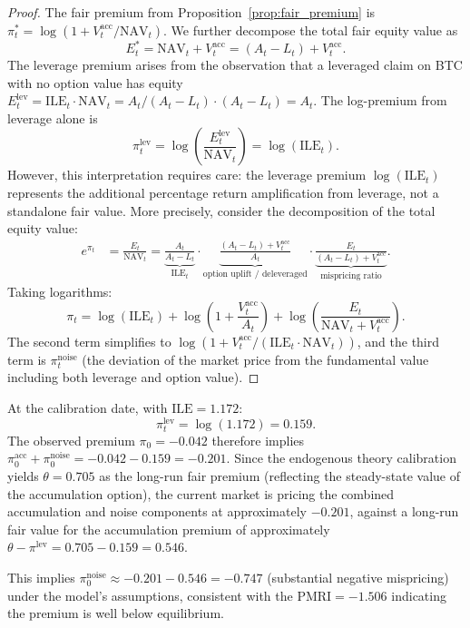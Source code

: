\begin{proof}
The fair premium from Proposition~\ref{prop:fair_premium} is $\pi_t^* = \log(1 + V_t^{\mathrm{acc}} / \mathrm{NAV}_t)$. We further decompose the total fair equity value as
\[
  E_t^* = \mathrm{NAV}_t + V_t^{\mathrm{acc}} = (A_t - L_t) + V_t^{\mathrm{acc}}.
\]
The leverage premium arises from the observation that a leveraged claim on BTC with no option value has equity $E_t^{\mathrm{lev}} = \mathrm{ILE}_t \cdot \mathrm{NAV}_t = A_t / (A_t - L_t) \cdot (A_t - L_t) = A_t$. The log-premium from leverage alone is
\[
  \pi_t^{\mathrm{lev}} = \log\!\left(\frac{E_t^{\mathrm{lev}}}{\mathrm{NAV}_t}\right) = \log(\mathrm{ILE}_t).
\]
However, this interpretation requires care: the leverage premium $\log(\mathrm{ILE}_t)$ represents the additional percentage return amplification from leverage, not a standalone fair value. More precisely, consider the decomposition of the total equity value:
\begin{align*}
  e^{\pi_t} &= \frac{E_t}{\mathrm{NAV}_t} = \underbrace{\frac{A_t}{A_t - L_t}}_{\mathrm{ILE}_t} \cdot \underbrace{\frac{(A_t - L_t) + V_t^{\mathrm{acc}}}{A_t}}_{\text{option uplift / deleveraged}} \cdot \underbrace{\frac{E_t}{(A_t - L_t) + V_t^{\mathrm{acc}}}}_{\text{mispricing ratio}}.
\end{align*}
Taking logarithms:
\[
  \pi_t = \log(\mathrm{ILE}_t) + \log\!\left(1 + \frac{V_t^{\mathrm{acc}}}{A_t}\right) + \log\!\left(\frac{E_t}{\mathrm{NAV}_t + V_t^{\mathrm{acc}}}\right).
\]
The second term simplifies to $\log(1 + V_t^{\mathrm{acc}} / (\mathrm{ILE}_t \cdot \mathrm{NAV}_t))$, and the third term is $\pi_t^{\mathrm{noise}}$ (the deviation of the market price from the fundamental value including both leverage and option value).
\end{proof}

\begin{corollary}
\label{cor:current_decomp}
At the calibration date, with $\mathrm{ILE} = 1.172$:
\begin{equation}
\label{eq:current_decomp}
  \pi_t^{\mathrm{lev}} = \log(1.172) = 0.159.
\end{equation}
The observed premium $\pi_0 = -0.042$ therefore implies $\pi_0^{\mathrm{acc}} + \pi_0^{\mathrm{noise}} = -0.042 - 0.159 = -0.201$. Since the endogenous theory calibration yields $\theta = 0.705$ as the long-run fair premium (reflecting the steady-state value of the accumulation option), the current market is pricing the combined accumulation and noise components at approximately $-0.201$, against a long-run fair value for the accumulation premium of approximately $\theta - \pi^{\mathrm{lev}} = 0.705 - 0.159 = 0.546$.

This implies $\pi_0^{\mathrm{noise}} \approx -0.201 - 0.546 = -0.747$ (substantial negative mispricing) under the model's assumptions, consistent with the $\mathrm{PMRI} = -1.506$ indicating the premium is well below equilibrium.
\end{corollary}

